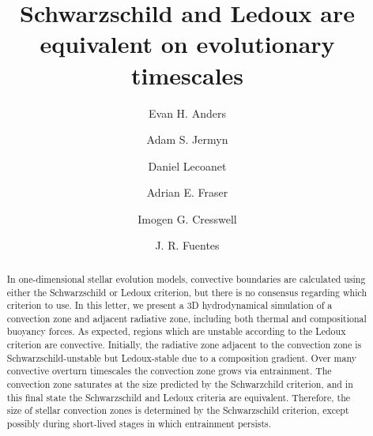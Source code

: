 \documentclass[twocolumn, linenumbers, twocolappendix]{aastex631}
\begin{document}
\title{Schwarzschild and Ledoux are equivalent on evolutionary timescales}
\author[0000-0002-3433-4733]{Evan H. Anders}
\author[0000-0001-5048-9973]{Adam S. Jermyn}
\author[0000-0002-7635-9728]{Daniel Lecoanet}
\author[0000-0003-4323-2082]{Adrian E. Fraser}
\author[0000-0002-4538-7320]{Imogen G. Cresswell}
\author[0000-0003-2124-9764]{J. R. Fuentes}


\begin{abstract}
    In one-dimensional stellar evolution models, convective boundaries are calculated using either the Schwarzschild or Ledoux criterion, but there is no consensus regarding which criterion to use.
    In this letter, we present a 3D hydrodynamical simulation of a convection zone and adjacent radiative zone, including both thermal and compositional buoyancy forces.
    As expected, regions which are unstable according to the Ledoux criterion are convective.
    Initially, the radiative zone adjacent to the convection zone is Schwarzschild-unstable but Ledoux-stable due to a composition gradient.
    Over many convective overturn timescales the convection zone grows via entrainment.
    The convection zone saturates at the size predicted by the Schwarzchild criterion, and in this final state the Schwarzschild and Ledoux criteria are equivalent.
    Therefore, the size of stellar convection zones is determined by the Schwarzschild criterion, except possibly during short-lived stages in which entrainment persists.
\end{abstract}
\end{document}
